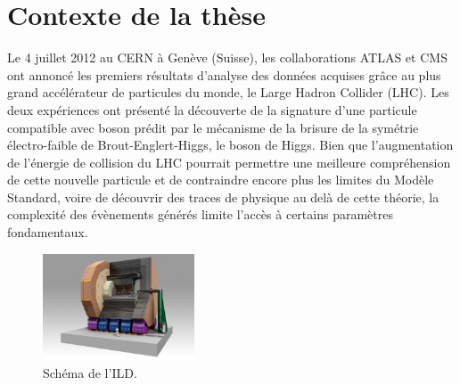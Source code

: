 \documentclass[a4papper, 10pt]{article}
\title{\textbf{Intelligent detection layers for advanced tracking in high-energy physics} \\ \large \vskip 1ex
        Résumé de la thèse de doctorat}
\author{Benjamin Boitrelle \\ 
        Sous la direction de : \\
        Jérôme Baudot : Directeur de thèse à l'Université de Strasbourg \\
        Ingrid Maria Gregor : Encadrante au laboratoire d'accueil au DESY de Hambourg}
\date{}
\begin{document}
    \maketitle


  \section{Contexte de la thèse}

  Le 4 juillet 2012 au CERN à Genève (Suisse), les collaborations ATLAS et CMS ont annoncé les premiers résultats d'analyse des données acquises grâce au plus grand accélérateur de particules du monde, le Large Hadron Collider (LHC)\cite{Aad2012}\cite{Chatrchyan2012}. 
  Les deux expériences ont présenté la découverte de la signature d'une particule compatible avec boson prédit par le mécanisme de la brisure de la symétrie électro-faible de Brout-Englert-Higgs, le boson de Higgs.
  Bien que l'augmentation de l'énergie de collision du LHC pourrait permettre une meilleure compréhension de cette nouvelle particule et de contraindre encore plus les limites du Modèle Standard, voire de découvrir des traces de physique au delà de cette théorie, la complexité des évènements générés limite l'accès à certains paramètres fondamentaux.
  
  \begin{figure}[!h]
    \centering
    \includegraphics[width = 0.4\textwidth]{Pictures/ILD.jpg}
    \caption{Schéma de l'ILD.}
    \label{fig:ILD}
  \end{figure}
 
\end{document}
